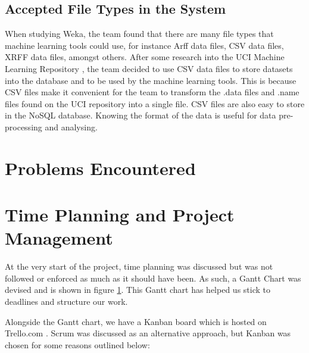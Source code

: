 \documentclass[titlepage]{article}
\begin{document}
\subsection{Accepted File Types in the System}

When studying Weka, the team found that there are many file types that machine learning tools could use, for instance Arff data files, CSV data files, XRFF data files, amongst others. After some research into the UCI Machine Learning Repository \cite{uci}, the team decided to use CSV data files to store datasets into the database and to be used by the machine learning tools. This is because CSV files make it convenient for the team to transform the .data files and .name files found on the UCI repository into a single file. CSV files are also easy to store in the NoSQL database. Knowing the format of the data is useful for data pre-processing and analysing.

\section{Problems Encountered}

\section{Time Planning and Project Management}
At the very start of the project, time planning was discussed but was not followed or enforced as much as it should have been. As such, a Gantt Chart was devised and is shown in figure \ref{ganttchart}. This Gantt chart has helped us stick to deadlines and structure our work.

\begin{figure}\label{ganttchart}
  
\end{figure}

Alongside the Gantt chart, we have a Kanban board which is hosted on Trello.com \cite{trello}. Scrum was discussed as an alternative approach, but Kanban was chosen for some reasons outlined below:
\end{document}

